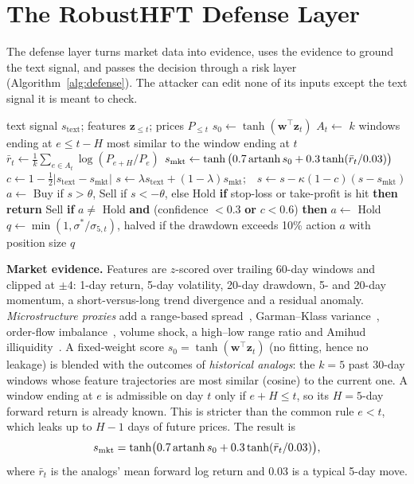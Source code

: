 \section{The RobustHFT Defense Layer}\label{sec:defense}
The defense layer turns market data into evidence, uses the evidence to ground the text signal, and passes the decision through a risk layer (Algorithm~\ref{alg:defense}). The attacker can edit none of its inputs except the text signal it is meant to check.

\begin{algorithm}[t]
\caption{RobustHFT defense layer on day $t$}\label{alg:defense}
\small
\begin{algorithmic}[1]
\Require text signal $s_{\mathrm{text}}$; features $\mathbf{z}_{\le t}$; prices $P_{\le t}$
\State $s_0\gets\tanh(\mathbf{w}^{\top}\mathbf{z}_t)$ 
\State $A_t\gets$ $k$ windows ending at $e\le t-H$ most similar to the window ending at $t$
\State $\bar r_t\gets\frac{1}{k}\sum_{e\in A_t}\log(P_{e+H}/P_e)$ 
\State $s_{\mathrm{mkt}}\gets\tanh\big(0.7\operatorname{artanh} s_0+0.3\tanh(\bar r_t/0.03)\big)$
\State $c\gets 1-\tfrac12\lvert s_{\mathrm{text}}-s_{\mathrm{mkt}}\rvert$ 
\State $s\gets\lambda s_{\mathrm{text}}+(1-\lambda)s_{\mathrm{mkt}}$;\ \ $s\gets s-\kappa(1-c)(s-s_{\mathrm{mkt}})$
\State $a\gets$ Buy if $s>\theta$, Sell if $s<-\theta$, else Hold
\State \textbf{if} stop-loss or take-profit is hit \textbf{then return} Sell
\State \textbf{if} $a\neq$ Hold \textbf{and} (confidence $<0.3$ \textbf{or} $c<0.6$) \textbf{then} $a\gets$ Hold
\State $q\gets\min(1,\sigma^{*}/\sigma_{5,t})$, halved if the drawdown exceeds 10\%
\State \Return action $a$ with position size $q$
\end{algorithmic}
\end{algorithm}

\textbf{Market evidence.} Features are $z$-scored over trailing 60-day windows and clipped at $\pm4$: 1-day return, 5-day volatility, 20-day drawdown, 5- and 20-day momentum, a short-versus-long trend divergence and a residual anomaly. \emph{Microstructure proxies} add a range-based spread~\cite{corwin2012spread}, Garman--Klass variance~\cite{garman1980estimation}, order-flow imbalance~\cite{cont2014price}, volume shock, a high--low range ratio and Amihud illiquidity~\cite{amihud2002illiquidity}. A fixed-weight score $s_0=\tanh(\mathbf{w}^{\top}\mathbf{z}_t)$ (no fitting, hence no leakage) is blended with the outcomes of \emph{historical analogs}: the $k=5$ past 30-day windows whose feature trajectories are most similar (cosine) to the current one. A window ending at $e$ is admissible on day $t$ only if $e+H\le t$, so its $H=5$-day forward return is already known. This is stricter than the common rule $e<t$, which leaks up to $H-1$ days of future prices. The result is
\begin{equation}
s_{\mathrm{mkt}}=\tanh\!\big(0.7\operatorname{artanh} s_0+0.3\tanh(\bar r_t/0.03)\big),\label{eq:smkt}
\end{equation}
where $\bar r_t$ is the analogs' mean forward log return and $0.03$ is a typical 5-day move.

